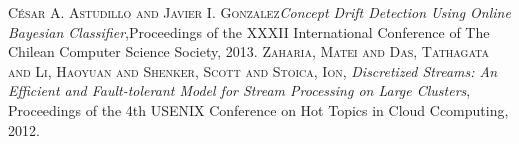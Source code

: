 \renewcommand{\baselinestretch}{1.05}\small\normalsize
\begin{thebibliography}{9}
 \textsc{C\'esar A. Astudillo and Javier I. Gonzalez}\textit{Concept Drift Detection Using Online Bayesian Classifier},Proceedings of the XXXII International Conference of The Chilean Computer Science Society, 2013.
 \textsc{Zaharia, Matei and Das, Tathagata and Li, Haoyuan and Shenker, Scott and Stoica, Ion}, \textit{Discretized Streams: An Efficient and Fault-tolerant Model for Stream Processing on Large Clusters}, Proceedings of the 4th USENIX Conference on Hot Topics in Cloud Ccomputing, 2012.
\end{thebibliography}


